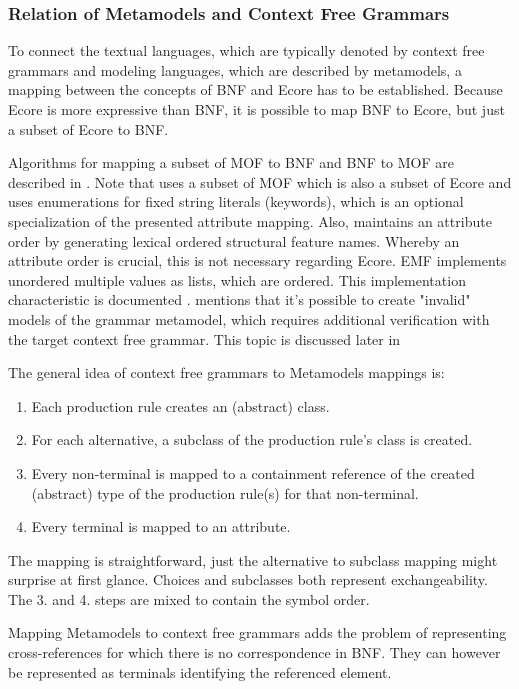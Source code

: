 

\subsubsection{Relation of Metamodels and Context Free Grammars} \label{sec:MM:CFGs}
To connect the textual languages, which are typically denoted by context free grammars and modeling languages, which are described by metamodels, a mapping between the concepts of BNF and Ecore has to be established. Because Ecore is more expressive than BNF, it is possible to map BNF to Ecore, but just a subset of Ecore to BNF.

Algorithms for mapping a subset of MOF to BNF and BNF to MOF are described in \cite{MofCfg}. Note that \cite{MofCfg} uses a subset of MOF which is also a subset of Ecore and uses enumerations for fixed string literals (keywords), which is an optional specialization of the presented attribute mapping. Also,  \cite{MofCfg} maintains an attribute order by generating lexical ordered structural feature names. Whereby an attribute order is crucial, this is not necessary regarding Ecore. EMF implements unordered multiple values as lists, which are ordered. This implementation characteristic is documented \cite{EMF2nd}.  \cite{MofCfg} mentions that it's possible to create "invalid" models of the grammar metamodel, which requires additional verification with the target context free grammar. This topic is discussed later in 

The general idea of context free grammars to Metamodels mappings is:
\begin{enumerate}
	\item Each production rule creates an (abstract) class.
	\item For each alternative,  a subclass of the production rule's class is created.
	\item Every non-terminal is mapped to a containment reference of the created (abstract) type of the production rule(s) for that non-terminal.
	\item Every terminal is mapped to an attribute.
\end{enumerate}

The mapping is straightforward, just the alternative to subclass mapping might surprise at first glance. Choices and subclasses both represent exchangeability. The 3. and 4. steps are mixed to contain the symbol order.

Mapping Metamodels to context free grammars adds the problem of representing cross-references for which there is no correspondence in BNF. They can however be represented as terminals identifying the referenced element.   

